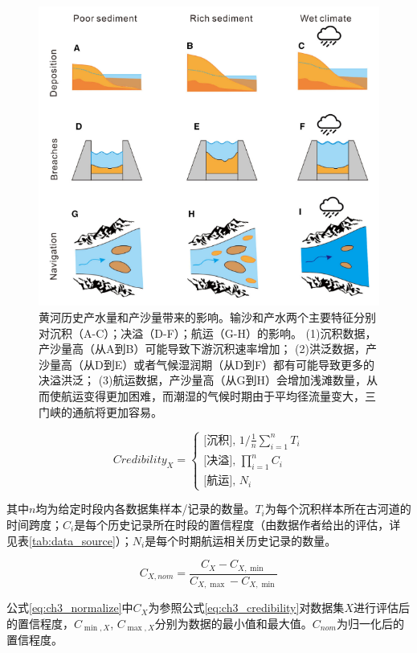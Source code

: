 \begin{figure}[htb] %
    \centering
    \includegraphics[width=\textwidth]{img/ch3/ch3_impacts_diagram.png}
    \caption[黄河历史产水量和产沙量变化的影响]{黄河历史产水量和产沙量带来的影响。输沙和产水两个主要特征分别对沉积（A-C）；决溢（D-F）；航运（G-H）的影响。
    (1)沉积数据，产沙量高（从A到B）可能导致下游沉积速率增加\cite{xu2003a}；
    (2)洪泛数据，产沙量高（从D到E）或者气候湿润期（从D到F）都有可能导致更多的决溢洪泛\cite{chen2012}；
    (3)航运数据，产沙量高（从G到H）会增加浅滩数量，从而使航运变得更加困难，而潮湿的气候时期由于平均径流量变大，三门峡的通航将更加容易\cite{WangShouChun1993}。}\label{fig:ch3:impacts_diagram}
\end{figure}



\begin{equation}
    \label{eq:ch3_credibility}
    Credibility_X = 
    \left\{\begin{array}{l}
        \text{[沉积], } 1 / \frac{1}{n} \sum_{i=1}^n T_i\\
        \text{[决溢], } \prod_{i=1}^n C_i\\
        \text{[航运], } N_i
    \end{array}\right.
\end{equation}    

其中$n$均为给定时段内各数据集样本/记录的数量。$T_i$为每个沉积样本所在古河道的时间跨度；$C_i$是每个历史记录所在时段的置信程度（由数据作者给出的评估，详见表\ref{tab:data_source}）；$N_i$是每个时期航运相关历史记录的数量。

\begin{equation}
    \label{eq:ch3_normalize}
    C_{X, nom}=\frac{C_X-C_{X, \min}}{C_{X, \max}-C_{X, \min}}
\end{equation}

公式\ref{eq:ch3_normalize}中$C_{X}$为参照公式\ref{eq:ch3_credibility}对数据集$X$进行评估后的置信程度，$C_{\min, X}$, $C_{\max, X}$分别为数据的最小值和最大值。$C_{nom}$为归一化后的置信程度。
